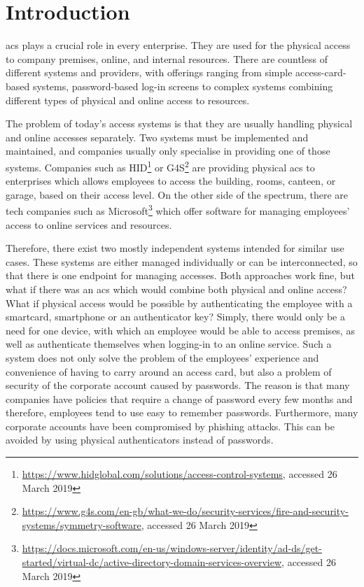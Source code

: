 \section{Introduction}
% 
\acrfull{acs} plays a crucial role in every enterprise. They are used for the physical access to company premises, online, and internal resources. There are countless of different systems and providers, with offerings ranging from simple access-card-based systems, password-based log-in screens to complex systems combining different types of physical and online access to resources. 

The problem of today’s access systems is that they are usually handling physical and online accesses separately. Two systems must be implemented and maintained, and companies usually only specialise in providing one of those systems. Companies such as HID\footnote{\url{https://www.hidglobal.com/solutions/access-control-systems}, accessed 26 March 2019} or G4S\footnote{\url{https://www.g4s.com/en-gb/what-we-do/security-services/fire-and-security-systems/symmetry-software}, accessed 26 March 2019} are providing physical \acrshort{acs} to enterprises which allows employees to access the building, rooms, canteen, or garage, based on their access level. On the other side of the spectrum, there are tech companies such as Microsoft\footnote{\url{https://docs.microsoft.com/en-us/windows-server/identity/ad-ds/get-started/virtual-dc/active-directory-domain-services-overview}, accessed 26 March 2019} which offer software for managing employees’ access to online services and resources.

Therefore, there exist two mostly independent systems intended for similar use cases. These systems are either managed individually or can be interconnected, so that there is one endpoint for managing accesses. Both approaches work fine, but what if there was an \acrshort{acs} which would combine both physical and online access? What if physical access would be possible by authenticating the employee with a smartcard, smartphone or an authenticator key? Simply, there would only be a need for one device, with which an employee would be able to access premises, as well as authenticate themselves when logging-in to an online service. Such a system does not only solve the problem of the employees’ experience and convenience of having to carry around an access card, but also a problem of security of the corporate account caused by passwords. The reason is that many companies have policies that require a change of password every few months and therefore, employees tend to use easy to remember passwords. Furthermore, many corporate accounts have been compromised by phishing attacks\cite{Kessem2017CanadianAttacks}. This can be avoided by using physical authenticators instead of passwords.

